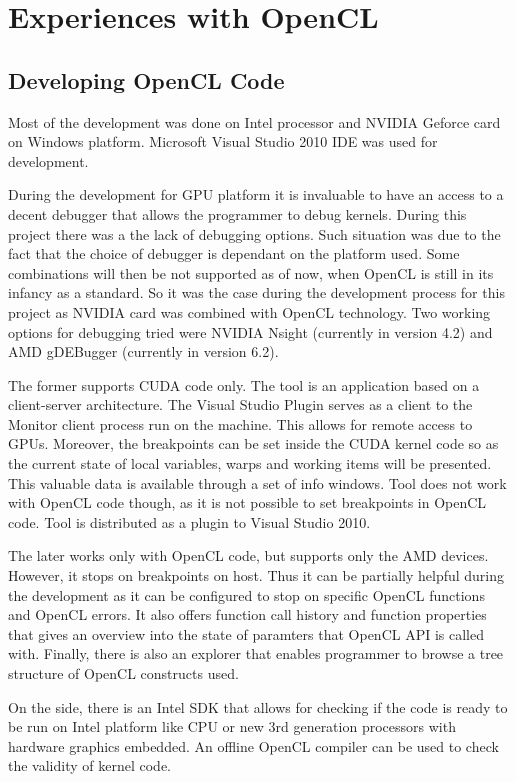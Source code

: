 \section{Experiences with OpenCL}
\subsection{Developing OpenCL Code}
Most of the development was done on Intel processor and NVIDIA Geforce card on Windows platform. Microsoft Visual Studio 2010 IDE was used for development.

During the development for GPU platform it is invaluable to have an access to a decent debugger that allows the programmer to debug kernels. During this project there was a the lack of debugging options. Such situation was due to the fact that the choice of debugger is dependant on the platform used. Some combinations will then be not supported as of now, when OpenCL is still in its infancy as a standard. So it was the case during the development process for this project as NVIDIA card was combined with OpenCL technology.  Two working options for debugging tried were NVIDIA Nsight (currently in version 4.2) and AMD gDEBugger (currently in version 6.2).

The former supports CUDA code only. The tool is an application based on a client-server architecture.  The Visual Studio Plugin serves as a client to the Monitor client process run on the machine. This allows for remote access to GPUs. Moreover, the breakpoints can be set inside the CUDA kernel code so as the current state of local variables, warps and working items will be presented. This valuable data is available through a set of info windows. Tool does not work with OpenCL code though, as it is not possible to set breakpoints in OpenCL code. Tool is distributed as a plugin to Visual Studio 2010.

The later works only with OpenCL code, but supports only the AMD devices. However, it stops on breakpoints on host. Thus it can be partially helpful during the development as it can be configured to stop on specific OpenCL functions and OpenCL errors. It also offers function call history and function properties that gives an overview into the state of paramters that OpenCL API is called with. Finally, there is also an explorer that enables programmer to browse a tree structure of OpenCL constructs used.

On the side, there is an Intel SDK that allows for checking if the code is ready to be run on Intel platform like CPU or new 3rd generation processors with hardware graphics embedded. An offline OpenCL compiler can be used to check the validity of kernel code. 

